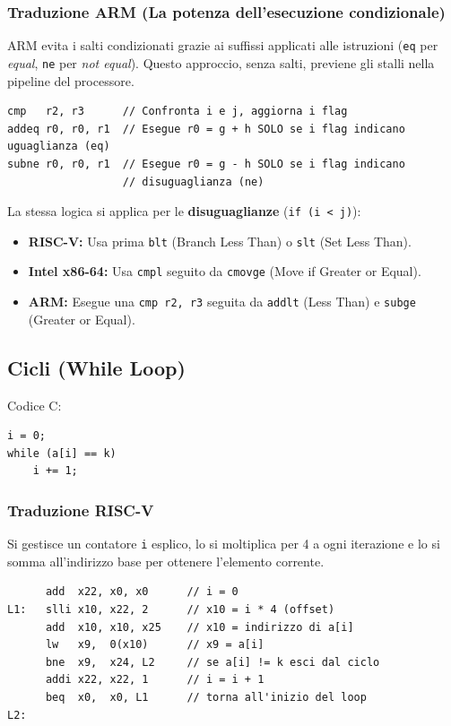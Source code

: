 \documentclass[12pt, a4paper]{article}
\begin{document}
\subsubsection{Traduzione ARM (La potenza dell'esecuzione condizionale)}
ARM evita i salti condizionati grazie ai suffissi applicati alle istruzioni (\texttt{eq} per \textit{equal}, \texttt{ne} per \textit{not equal}). Questo approccio, senza salti, previene gli stalli nella pipeline del processore.
\begin{verbatim}
cmp   r2, r3      // Confronta i e j, aggiorna i flag
addeq r0, r0, r1  // Esegue r0 = g + h SOLO se i flag indicano uguaglianza (eq)
subne r0, r0, r1  // Esegue r0 = g - h SOLO se i flag indicano 
                  // disuguaglianza (ne)
\end{verbatim}

La stessa logica si applica per le \textbf{disuguaglianze} (\texttt{if (i < j)}):
\begin{itemize}
    \item \textbf{RISC-V:} Usa prima \texttt{blt} (Branch Less Than) o \texttt{slt} (Set Less Than).
    \item \textbf{Intel x86-64:} Usa \texttt{cmpl} seguito da \texttt{cmovge} (Move if Greater or Equal).
    \item \textbf{ARM:} Esegue una \texttt{cmp r2, r3} seguita da \texttt{addlt} (Less Than) e \texttt{subge} (Greater or Equal).
\end{itemize}

\subsection{Cicli (While Loop)}
Codice C:
\begin{verbatim}
i = 0;
while (a[i] == k)
    i += 1;
\end{verbatim}

\subsubsection{Traduzione RISC-V}
Si gestisce un contatore \texttt{i} esplico, lo si moltiplica per 4 a ogni iterazione e lo si somma all'indirizzo base per ottenere l'elemento corrente.
\begin{verbatim}
      add  x22, x0, x0      // i = 0
L1:   slli x10, x22, 2      // x10 = i * 4 (offset)
      add  x10, x10, x25    // x10 = indirizzo di a[i]
      lw   x9,  0(x10)      // x9 = a[i]
      bne  x9,  x24, L2     // se a[i] != k esci dal ciclo
      addi x22, x22, 1      // i = i + 1
      beq  x0,  x0, L1      // torna all'inizio del loop
L2:
\end{verbatim}
\end{document}
